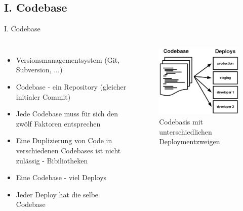 \documentclass{beamer}
\begin{document}
			\subsection{I. Codebase}
				\begin{frame}{I. Codebase}
					\begin{columns}
							\begin{itemize}
								\item Versionsmanagementsystem (Git, Subversion, ...)
								\item Codebase - ein Repository (gleicher initialer Commit)
								\item Jede Codebase muss für sich den zwölf Faktoren entsprechen
								\item Eine Duplizierung von Code in verschiedenen Codebases ist nicht zulässig - Bibiliotheken
								\item Eine Codebase - viel Deploys
								\item Jeder Deploy hat die selbe Codebase
							\end{itemize}
						\begin{figure}
							\includegraphics[width=\textwidth]{codebase-deploys.png}
							\caption{Codebasis mit unterschiedlichen Deploymentzweigen \cite{factor-codebase}}
						\end{figure}
					\end{columns}
				\end{frame}
\end{document}
